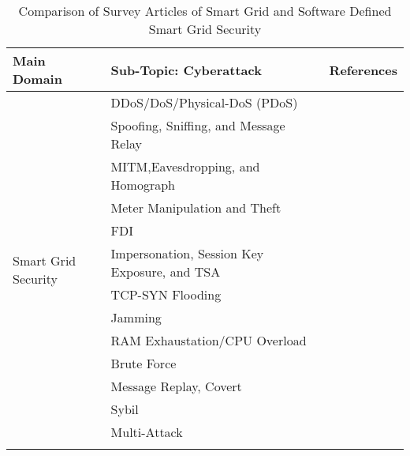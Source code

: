 \documentclass[conference]{IEEEtran}
\begin{document}
\begin{table*}
\centering

\caption{Comparison of Survey Articles of Smart Grid and Software Defined Smart Grid Security}
\begin{tabular}{|p{4.5cm}|p{4.5cm}|p{4.5cm}|}

\hline
\label{Related_Survey_Articles_SG_and SD-SG}
Main Domain & Sub-Topic: Cyberattack & References \\
\hline
\multirow{17}{*}{Smart Grid Security} & 
DDoS/DoS/Physical-DoS (PDoS)  & \cite{hahn2011cyber,pedramnia2018survey,lee2020study, feher2020smart}\\\cline{2-3}
&Spoofing, Sniffing, and Message Relay & \cite{wang2011analysis, ali2013randomizing, rajkumar2020cyber, mohan2020distributed}\\\cline{2-3}
&MITM,Eavesdropping, and Homograph & \cite{baig2013analysis, fritz2019simulation, wlazlo2021man, khan2022elliptic, el2018cyber}\\\cline{2-3}
&Meter Manipulation and Theft & \cite{farokhi2020review, kim2019detection, singh2021blockchain, han2016fnfd}\\\cline{2-3}
&FDI & \cite{musleh2019survey, duan2016resilient, chung2017local, jiang2017real}\\\cline{2-3}
&Impersonation, Session Key Exposure, and TSA & \cite{srivastava2021emerging, wu2019anonymous, chaudhry2022sg, ebrahimabadi2021hardware, chen2022anonymous, shereen2019model}\\\cline{2-3}

&TCP-SYN Flooding & \cite{bogdanoski2013analysis, holik2022threat,ansilla2015data, kwon2015behavior}\\\cline{2-3}
&Jamming & \cite{gunduz2020cyber, gai2017spoofing, ma2015multiact, lu2014camouflage, zhang2022jamming, xu2021cooperative}\\\cline{2-3}
&RAM Exhaustation/CPU Overload & \cite{  chen2012smart, sun2020intrusion, fadlullah2011early}\\\cline{2-3}
&Brute Force & \cite{cairns2013flexible,nge2019real, nicanfar2011smart,sha2016secure}\\\cline{2-3}
&Message Replay, Covert & \cite{tran2013detection, farraj2017distributed,pavithra2021prevention,li2013efficient, tanveer2021robust, ahmed2018feature}\\\cline{2-3}

&Sybil & \cite{wei2011protecting, najafabadi2013sybil, sriranjani2023received, kumari2020performance}\\\cline{2-3}
&Multi-Attack &\cite{feher2020side, ali2014two,gayathri2019multi, abou2022ensemble, sakhnini2021physical
}\\\cline{2-3}


\end{tabular}
\end{table*}
\end{document}
